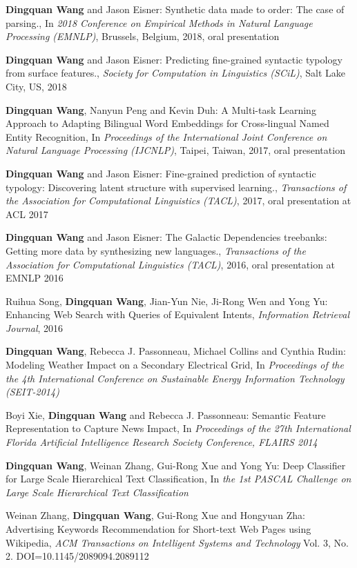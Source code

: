 \documentclass[margin,line]{res}
\begin{document}
\begin{resume}
\textbf{Dingquan Wang} and Jason Eisner: Synthetic data made to order: The case of parsing., In \emph{2018 Conference on Empirical Methods in Natural Language Processing (EMNLP)}, Brussels, Belgium, 2018, oral presentation

\textbf{Dingquan Wang} and Jason Eisner: Predicting fine-grained syntactic typology from surface features., \emph{Society for Computation in Linguistics (SCiL)}, Salt Lake City, US, 2018

\textbf{Dingquan Wang}, Nanyun Peng and Kevin Duh: A Multi-task Learning Approach to Adapting Bilingual Word Embeddings for Cross-lingual Named Entity Recognition, In \emph{Proceedings of the International Joint Conference on Natural Language Processing (IJCNLP)}, Taipei, Taiwan, 2017, oral presentation

\textbf{Dingquan Wang} and Jason Eisner: Fine-grained prediction of syntactic typology: Discovering latent structure with supervised learning., \emph{Transactions of the Association for Computational Linguistics (TACL)}, 2017, oral presentation at ACL 2017

\textbf{Dingquan Wang} and Jason Eisner: The Galactic Dependencies treebanks: Getting more data by synthesizing new languages., \emph{Transactions of the Association for Computational Linguistics (TACL)}, 2016, oral presentation at EMNLP 2016

Ruihua Song, \textbf{Dingquan Wang}, Jian-Yun Nie, Ji-Rong Wen and Yong Yu: Enhancing Web Search with Queries of Equivalent Intents, \emph{Information Retrieval Journal}, 2016

\textbf{Dingquan Wang}, Rebecca J. Passonneau, Michael Collins and Cynthia Rudin: Modeling Weather Impact on a Secondary Electrical Grid, In \emph{Proceedings of the the 4th International Conference on Sustainable Energy Information Technology (SEIT-2014)} 

Boyi Xie, \textbf{Dingquan Wang} and Rebecca J. Passonneau: Semantic Feature Representation to Capture News Impact, In \emph{Proceedings of the 27th International Florida Artificial Intelligence Research Society Conference, FLAIRS 2014}

\textbf{Dingquan Wang}, Weinan Zhang, Gui-Rong Xue and Yong Yu: Deep Classifier for Large Scale Hierarchical Text Classification, In\emph{ the 1st PASCAL Challenge on Large Scale Hierarchical Text Classification}

Weinan Zhang, \textbf{Dingquan Wang}, Gui-Rong Xue and Hongyuan Zha: Advertising Keywords Recommendation for Short-text Web Pages using Wikipedia, \emph{ACM Transactions on Intelligent Systems and Technology} Vol. 3, No. 2. DOI=10.1145/2089094.2089112 


\end{resume}
\end{document}
